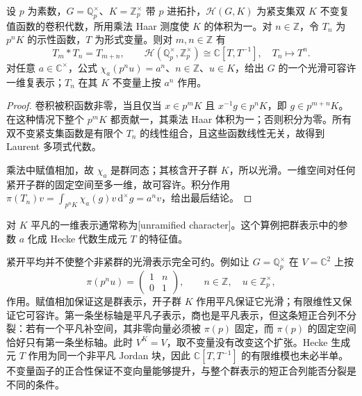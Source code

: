 \begin{proposition}\label{b5:prop:padic-torus-hecke}
	设 \(p\) 为素数，\(G=\mathbb Q_p^\times\)、\(K=\mathbb Z_p^\times\) 带 \(p\) 进拓扑，\(\mathcal H(G,K)\) 为紧支集双 \(K\) 不变复值函数的卷积代数，所用乘法 Haar 测度使 \(K\) 的体积为一。对 \(n\in\mathbb Z\)，令 \(T_n\) 为 \(p^nK\) 的示性函数，\(T\) 为形式变量。则对 \(m,n\in\mathbb Z\) 有
	\[
		T_m*T_n=T_{m+n},\qquad \mathcal H(\mathbb Q_p^\times,\mathbb Z_p^\times) \cong\mathbb C[T,T^{-1}],\quad T_n\longmapsto T^n.
	\]
	对任意 \(a\in\mathbb C^\times\)，公式 \(\chi_a(p^nu)=a^n\)、\(n\in\mathbb Z\)、\(u\in K\)，给出 \(G\) 的一个光滑可容许一维复表示；\(T_n\) 在其 \(K\) 不变量上按 \(a^n\) 作用。
\end{proposition}
\begin{proof}
	卷积被积函数非零，当且仅当 \(x\in p^mK\) 且 \(x^{-1}g\in p^nK\)，即 \(g\in p^{m+n}K\)。在这种情况下整个 \(p^mK\) 都贡献一，其乘法 Haar 体积为一；否则积分为零。所有双不变紧支集函数是有限个 \(T_n\) 的线性组合，且这些函数线性无关，故得到 Laurent 多项式代数。

	乘法中赋值相加，故 \(\chi_a\) 是群同态；其核含开子群 \(K\)，所以光滑。一维空间对任何紧开子群的固定空间至多一维，故可容许。积分作用 \(\pi(T_n)v=\int_{p^nK}\chi_a(g)v\,\mathrm{d}^\times g=a^nv\)，给出最后结论。
\end{proof}

对 \(K\) 平凡的一维表示通常称为[unramified character]。这个算例把群表示中的参数 \(a\) 化成 Hecke 代数生成元 \(T\) 的特征值。

\ProseParagraphBreak
紧开平均并不使整个非紧群的光滑表示完全可约。例如让 \(G=\mathbb Q_p^\times\) 在 \(V=\mathbb C^2\) 上按
\[
	\pi(p^nu)=\begin{pmatrix}1&n\\0&1\end{pmatrix},
	\qquad n\in\mathbb Z,\quad u\in\mathbb Z_p^\times,
\]
作用。赋值相加保证这是群表示，开子群 \(K\) 作用平凡保证它光滑；有限维性又保证它可容许。第一条坐标轴是平凡子表示，商也是平凡表示，但这条短正合列不分裂：若有一个平凡补空间，其非零向量必须被 \(\pi(p)\) 固定，而 \(\pi(p)\) 的固定空间恰好只有第一条坐标轴。此时 \(V^K=V\)，取不变量没有改变这个扩张。Hecke 生成元 \(T\) 作用为同一个非平凡 Jordan 块，因此 \(\mathbb C[T,T^{-1}]\) 的有限维模也未必半单。不变量函子的正合性保证不变向量能够提升，与整个群表示的短正合列能否分裂是不同的条件。

